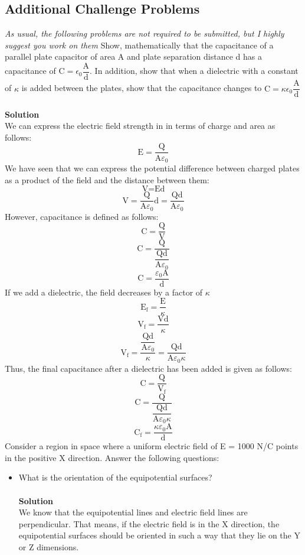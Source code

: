 \documentclass[9pt,addpoints]{exam}
\begin{document}
\begin{questions}
		\subsection*{Additional Challenge Problems}
		\textit{As usual, the following problems are not required to be submitted, but I highly suggest you work on them} 
		\question Show, mathematically that the capacitance of a parallel plate capacitor of area A and plate separation distance d has a capacitance of $\text{C}=\epsilon_0\dfrac{\text{A}}{\text{d}}$. In addition, show that when a dielectric with a constant of $\kappa$ is added between the plates, show that the capacitance changes to $\text{C}=\kappa\epsilon_0\dfrac{\text{A}}{\text{d}}$ \\ \\ \textbf{Solution}\\
		We can express the electric field strength in in terms of charge and area as follows:
		$$\text{E}=\dfrac{\text{Q}}{\text{A}\varepsilon_0}$$
		We have seen that we can express the potential difference between charged plates as a product of the field and the distance between them:
		$$\text{V}=\text{Ed}$$
		$$\text{V}=\dfrac{\text{Q}}{\text{A}\varepsilon_0}\text{d}=\dfrac{\text{Qd}}{\text{A}\varepsilon_0}$$
		However, capacitance is defined as follows:
		$$\text{C}=\dfrac{\text{Q}}{\text{V}}$$
		$$\text{C}=\dfrac{\text{Q}}{\dfrac{\text{Qd}}{\text{A}\varepsilon_0}}$$
		$$\text{C}=\dfrac{\varepsilon_0\text{A}}{\text{d}}$$
		If we add a dielectric, the field decreases by a factor of $\kappa$
		$$\text{E}_\text{f}=\dfrac{\text{E}}{\kappa}$$
		$$\text{V}_\text{f}=\dfrac{\text{Vd}}{\kappa}$$
		$$\text{V}_\text{f}=\dfrac{\dfrac{\text{Qd}}{\text{A}\varepsilon_0}}{\kappa}=\dfrac{\text{Qd}}{\text{A}\varepsilon_0\kappa}$$
		Thus, the final capacitance after a dielectric has been added is given as follows:
		$$\text{C}=\dfrac{\text{Q}}{\text{V}_\text{f}}$$
		$$\text{C}=\dfrac{\text{Q}}{\dfrac{\text{Qd}}{\text{A}\varepsilon_0\kappa}}$$
		$$\text{C}_\text{f}=\dfrac{\kappa\varepsilon_0\text{A}}{\text{d}}$$
		\question Consider a region in space where a uniform electric field of E = 1000 N/C points in the positive X direction. Answer the following questions:\begin{itemize}
			\item What is the orientation of the equipotential surfaces?\\ \\ \textbf{Solution}\\ 
			We know that the equipotential lines and electric field lines are perpendicular. That means, if the electric field is in the X direction, the equipotential surfaces should be oriented in such a way that they lie on the Y or Z dimensions.

\end{itemize}
\end{questions}
\end{document}
